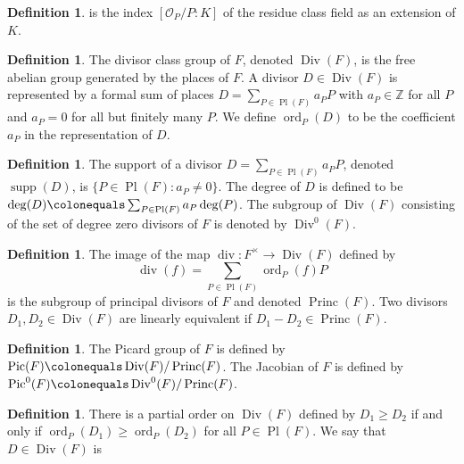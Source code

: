 \documentclass{dcthesis}
\newcommand{\OO}{\mathcal O}
\newcommand{\ZZ}{\mathbb Z}
\newcommand{\defi}[1]{\textsf{#1}}
\DeclareMathOperator{\Div}{Div}
\DeclareMathOperator{\Princ}{Princ}
\DeclareMathOperator{\Pic}{Pic}
\DeclareMathOperator{\ddiv}{div}
\DeclareMathOperator{\supp}{supp}
\DeclareMathOperator{\ord}{ord}
\DeclareMathOperator{\Pl}{Pl}
\numberwithin{equation}{section}
\theoremstyle{definition}
\newtheorem{definition}[equation]{Definition}
\theoremstyle{remark}
\begin{document}
{{{\begin{definition}
      is the index
      $[\OO_P/P:K]$
      of the
      \defi{residue class field}
      as an extension of $K$.
    \end{definition}
    \begin{definition}
      \label{def:divisorclassgroup}
      The \defi{divisor class group}
      of $F$, denoted $\Div(F)$,
      is the free abelian group
      generated by the places of $F$.
      A \defi{divisor}
      $D\in\Div(F)$ is represented by
      a formal sum of places
      $D = \sum_{P\in\Pl(F)}a_PP$
      with $a_P\in\ZZ$ for all $P$
      and $a_P=0$ for all but finitely many $P$.
      We define $\ord_P(D)$ to be the
      coefficient $a_P$ in the representation of
      $D$.
    \end{definition}
    \begin{definition}
      \label{def:suppordeg}
      The \defi{support} of a divisor
      $D=\sum_{P\in\Pl(F)}a_PP$,
      denoted $\supp(D)$,
      is $\{P\in\Pl(F):a_P\neq 0\}$.
      The \defi{degree} of $D$
      is defined to be
      $\deg(D)\colonequals\sum_{P\in\Pl(F)}
      a_P\deg(P)$.
      The subgroup of $\Div(F)$
      consisting of the set of
      \defi{degree zero divisors of $F$}
      is denoted by $\Div^0(F)$.
    \end{definition}
    \begin{definition}
      \label{def:principaldivisors}
      The image of the map
      $\ddiv\colon F^\times\to\Div(F)$
      defined by
      \begin{equation}
        \label{eqn:divf}
        \ddiv(f)=
        \sum_{P\in\Pl(F)}\ord_P(f)P
      \end{equation}
      is the subgroup of
      \defi{principal divisors}
      of $F$
      and denoted
      $\Princ(F)$.
      Two divisors $D_1,D_2\in\Div(F)$
      are \defi{linearly equivalent}
      if $D_1-D_2\in\Princ(F)$.
    \end{definition}
    \begin{definition}
      \label{def:pic}
      The \defi{Picard group} of $F$
      is defined by
      $\Pic(F)\colonequals\Div(F)/\Princ(F)$.
      The \defi{Jacobian} of $F$
      is defined by
      $\Pic^0(F)\colonequals\Div^0(F)/\Princ(F)$.
    \end{definition}
    \begin{definition}
      \label{def:effectivedivisor}
      There is a partial order on
      $\Div(F)$
      defined by
      $D_1\geq D_2$ if and only if
      $\ord_P(D_1)\geq\ord_P(D_2)$
      for all $P\in\Pl(F)$.
      We say that $D\in\Div(F)$ is

\end{definition}}}}
\end{document}
